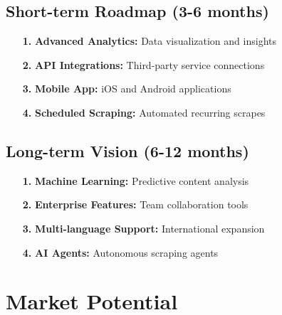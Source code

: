 \documentclass[12pt,a4paper]{report}
\begin{document}
\subsection{Short-term Roadmap (3-6 months)}

\begin{enumerate}[leftmargin=2cm]
    \item[\textcolor{accentorange}{\textbf{1.}}] \textbf{Advanced Analytics:} Data visualization and insights
    \item[\textcolor{accentorange}{\textbf{2.}}] \textbf{API Integrations:} Third-party service connections
    \item[\textcolor{accentorange}{\textbf{3.}}] \textbf{Mobile App:} iOS and Android applications
    \item[\textcolor{accentorange}{\textbf{4.}}] \textbf{Scheduled Scraping:} Automated recurring scrapes
\end{enumerate}

\subsection{Long-term Vision (6-12 months)}

\begin{enumerate}[leftmargin=2cm]
    \item[\textcolor{warningred}{\textbf{1.}}] \textbf{Machine Learning:} Predictive content analysis
    \item[\textcolor{warningred}{\textbf{2.}}] \textbf{Enterprise Features:} Team collaboration tools
    \item[\textcolor{warningred}{\textbf{3.}}] \textbf{Multi-language Support:} International expansion
    \item[\textcolor{warningred}{\textbf{4.}}] \textbf{AI Agents:} Autonomous scraping agents
\end{enumerate}

\section{Market Potential}
\end{document}
